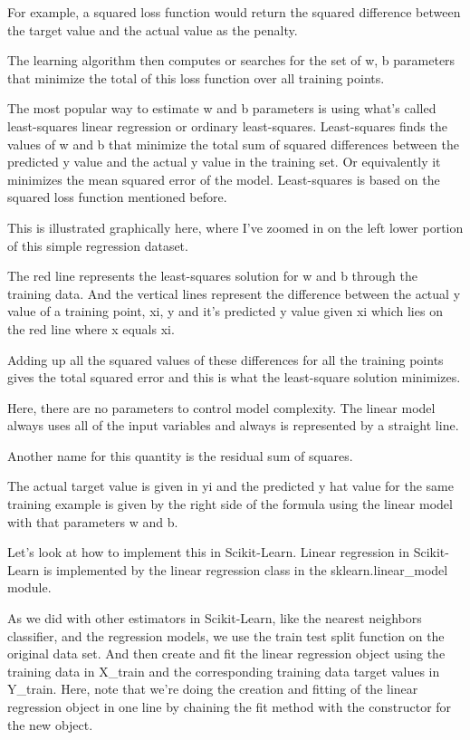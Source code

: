 \begin{multicols}{2}
For example, a squared loss function would return the squared difference between the target value and the actual value as the penalty. 

The learning algorithm then computes or searches for the set of w, b parameters that minimize the total of this loss function over all training points. 

The most popular way to estimate w and b parameters is using what's called least-squares linear regression or ordinary least-squares. Least-squares finds the values of w and b that minimize the total sum of squared differences between the predicted y value and the actual y value in the training set. Or equivalently it minimizes the mean squared error of the model. Least-squares is based on the squared loss function mentioned before. 

This is illustrated graphically here, where I've zoomed in on the left lower portion of this simple regression dataset. 

The red line represents the least-squares solution for w and b through the training data. And the vertical lines represent the difference between the actual y value of a training point, xi, y and it's predicted y value given xi which lies on the red line where x equals xi. 

Adding up all the squared values of these differences for all the training points gives the total squared error and this is what the least-square solution minimizes. 

Here, there are no parameters to control model complexity. The linear model always uses all of the input variables and always is represented by a straight line. 

Another name for this quantity is the residual sum of squares. 

The actual target value is given in yi and the predicted y hat value for the same training example is given by the right side of the formula using the linear model with that parameters w and b. 

Let's look at how to implement this in Scikit-Learn. Linear regression in Scikit-Learn is implemented by the linear regression class in the sklearn.linear_model module. 

As we did with other estimators in Scikit-Learn, like the nearest neighbors classifier, and the regression models, we use the train test split function on the original data set. And then create and fit the linear regression object using the training data in X_train and the corresponding training data target values in Y_train. Here, note that we're doing the creation and fitting of the linear regression object in one line by chaining the fit method with the constructor for the new object. 


\end{multicols}
